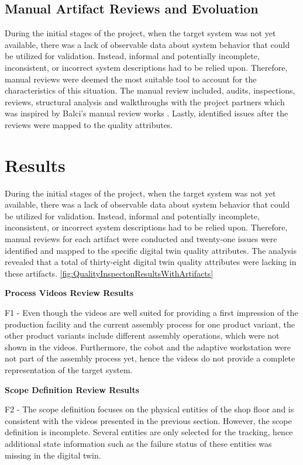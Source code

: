 \documentclass{llncs}
\begin{document}
    \subsection{Manual Artifact Reviews and Evoluation}
    During the initial stages of the project, when the target system was not yet available, there was a lack of observable data about system behavior that could be utilized for validation. 
    Instead, informal and potentially incomplete, inconsistent, or incorrect system descriptions had to be relied upon. Therefore, manual reviews were deemed the most suitable tool to account for the characteristics of this situation.
    The manual review included, audits, inspections, reviews, structural analysis 
    and walkthroughs with the project partners which was inspired by Balci's manual review works \cite{balcitechniques}. Lastly, identified issues after the reviews were mapped to the quality attributes. 
    
    \section{Results}
    During the initial stages of the project, when the target system was not yet available, there was a 
    lack of observable data about system behavior that could be utilized for validation. Instead, informal and potentially incomplete, inconsistent, or incorrect system descriptions had to be relied upon. 
    Therefore, manual reviews for each artifact were conducted and twenty-one issues were identified and mapped to the specific digital twin quality attributes. 
    The analysis revealed that a total of thirty-eight digital twin quality attributes were lacking in these artifacts. \ref{fig:QualityInspectonResultsWithArtifacts} 

\textbf{Process Videos Review Results}

F1  - Even though the videos are well suited for providing a first impression of the production facility and the current assembly process for one product variant, the other product variants include different assembly operations, 
which were not shown in the videos. Furthermore, the cobot and the adaptive workstation were not part of the assembly process yet, hence the videos do not provide a complete representation of the target system.  

\textbf{Scope Definition Review Results}

F2 - The scope definition focuses on the physical entities of the shop floor and is consistent with the videos presented in the previous section. 
However, the scope definition is incomplete. Several entities are only selected for the tracking, hence additional state information such as the failure status of these entities was missing in the digital twin. 
\end{document}

